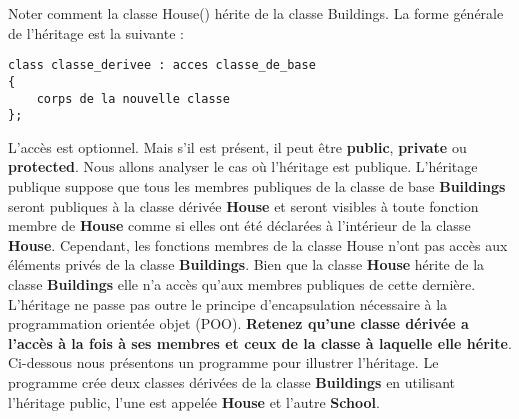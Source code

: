 \documentclass[a4paper, oneside,11pt]{book}
\begin{document}
Noter comment la classe House() h\'erite de la classe Buildings. La forme g\'en\'erale de l'h\'eritage est la suivante :
\begin{lstlisting}
class classe_derivee : acces classe_de_base
{
    corps de la nouvelle classe
};
\end{lstlisting}

L'acc\`es est optionnel. Mais s'il est pr\'esent, il peut \^etre \textbf{public}, \textbf{private} ou \textbf{protected}. 
Nous allons analyser le cas o\`u l'h\'eritage est publique. L'h\'eritage publique suppose que tous les membres
publiques de la classe de base \textbf{Buildings} seront publiques \`a la classe d\'eriv\'ee \textbf{House} et seront visibles
\`a toute fonction membre de \textbf{House} comme si elles ont \'et\'e d\'eclar\'ees \`a l'int\'erieur de la classe
\textbf{House}. Cependant, les fonctions membres de la classe House n'ont pas acc\`es aux \'el\'ements
priv\'es de la classe \textbf{Buildings}. Bien que la classe \textbf{House} h\'erite de la classe \textbf{Buildings} elle n'a acc\`es qu'aux membres publiques de 
cette derni\`ere. L'h\'eritage ne passe pas outre le principe 
d'encapsulation n\'ecessaire \`a la programmation orient\'ee objet (POO). \textbf{Retenez qu'une classe d\'eriv\'ee
a l'acc\`es \`a la fois \`a ses membres et ceux de la classe \`a laquelle elle h\'erite}. Ci-dessous nous pr\'esentons un programme pour illustrer l'h\'eritage. 
Le programme cr\'ee deux classes d\'eriv\'ees de la classe \textbf{Buildings} en utilisant l'h\'eritage public, l'une est appel\'ee \textbf{House} et l'autre \textbf{School}.
\end{document}
